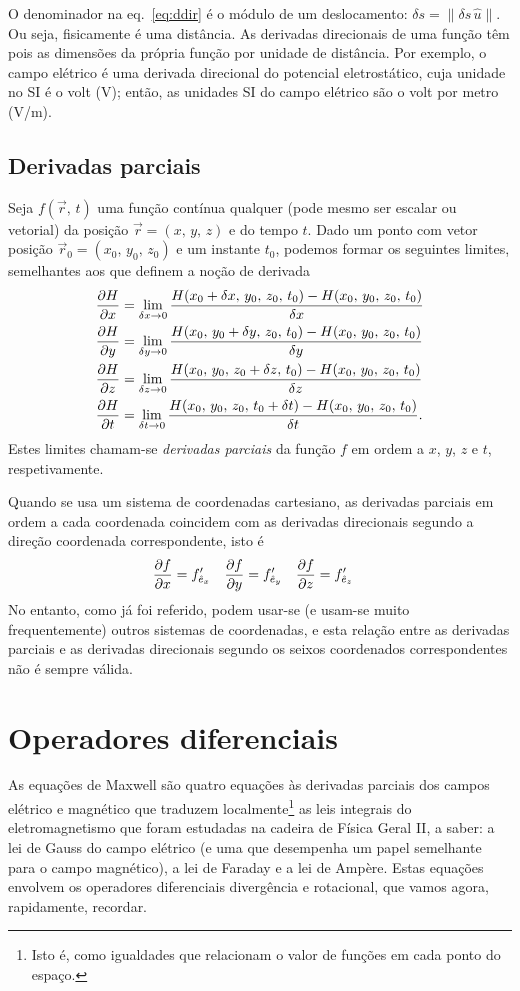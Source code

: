 O denominador na eq.~\eqref{eq:ddir} é o módulo de um deslocamento: $\delta
s=\|\delta s\,\hat u\|$. Ou seja, fisicamente é uma distância. As derivadas
direcionais de uma função têm pois as dimensões da própria função por unidade de
distância. Por exemplo, o campo elétrico é uma derivada direcional do potencial
eletrostático, cuja unidade no SI é o volt (V); então, as unidades SI do campo
elétrico são o volt por metro (V/m).

\subsection{Derivadas parciais}
Seja $f(\vec r,\,t)$ uma
função contínua qualquer (pode mesmo ser escalar ou vetorial) da posição $\vec
r=(x,\,y,\,z)$ e do tempo $t$. Dado um ponto com vetor posição $\vec
r_0=(x_0,\,y_0,\,z_0)$ e um instante $t_0$, podemos formar os seguintes limites,
semelhantes aos que definem a noção de derivada
\begin{align*}
\frac{\partial H}{\partial x}&=\lim_{\delta x\rightarrow0}
\frac{H(x_0+\delta x,\,y_0,\,z_0,\,t_0)- H(x_0,\,y_0,\,z_0,\,t_0)}{\delta x}\\
\frac{\partial H}{\partial y}&=\lim_{\delta y\rightarrow0}
\frac{H(x_0,\,y_0+\delta y,\,z_0,\,t_0)- H(x_0,\,y_0,\,z_0,\,t_0)}{\delta y}\\
\frac{\partial H}{\partial z}&=\lim_{\delta z\rightarrow0}
\frac{H(x_0,\,y_0,\,z_0+\delta z,\,t_0)- H(x_0,\,y_0,\,z_0,\,t_0)}{\delta z}\\
\frac{\partial H}{\partial t}&=\lim_{\delta t\rightarrow0}
\frac{H(x_0,\,y_0,\,z_0,\,t_0+\delta t)- H(x_0,\,y_0,\,z_0,\,t_0)}{\delta t}.
\end{align*}
Estes limites chamam-se \emph{derivadas parciais} da função $f$ em ordem
a $x$, $y$, $z$ e $t$, respetivamente.

Quando se usa um sistema de coordenadas cartesiano, as derivadas parciais em
ordem a cada coordenada coincidem com as derivadas direcionais segundo a direção
coordenada correspondente, isto é
\begin{align*}
\frac{\partial f}{\partial x}&=f'_{\hat e_x}&
\frac{\partial f}{\partial y}&=f'_{\hat e_y}&
\frac{\partial f}{\partial z}&=f'_{\hat e_z}
\end{align*}
No entanto, como já foi referido, podem usar-se (e usam-se muito frequentemente)
outros sistemas de coordenadas, e esta relação entre as derivadas parciais e as
derivadas direcionais segundo os seixos coordenados correspondentes não é sempre
válida.


\section{Operadores diferenciais}
As equações de Maxwell são quatro equações às derivadas parciais dos campos
elétrico e magnético que traduzem localmente\footnote{Isto é, como igualdades
que relacionam o valor de funções em cada ponto do espaço.} as leis integrais
do eletromagnetismo que foram estudadas na cadeira de Física Geral II, a saber:
a lei de Gauss do campo elétrico (e uma que desempenha um papel semelhante para
o campo magnético), a lei de Faraday e a lei de Ampère. Estas equações envolvem
os operadores diferenciais divergência e rotacional, que vamos agora,
rapidamente, recordar.

